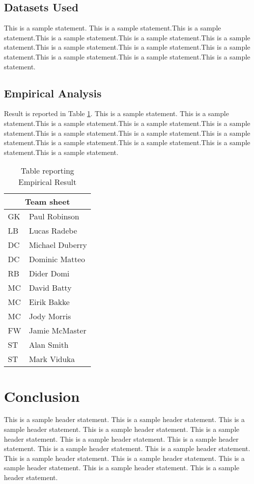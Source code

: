 \documentclass[12pt]{report}
\begin{document}
\section{Datasets Used}
This is a sample statement. This is a sample statement.This is a sample statement.This is a sample statement.This is a sample statement.This is a sample statement.This is a sample statement.This is a sample statement.This is a sample statement.This is a sample statement.This is a sample statement.This is a sample statement.

\section{Empirical Analysis}
Result is reported in Table \ref{sampletable}. This is a sample statement. This is a sample statement.This is a sample statement.This is a sample statement.This is a sample statement.This is a sample statement.This is a sample statement.This is a sample statement.This is a sample statement.This is a sample statement.This is a sample statement.This is a sample statement.

\begin{table}
\label{sampletable}
\caption{Table reporting Empirical Result}
\centering
\begin{tabular}{ |l|l| }
  \hline
  \multicolumn{2}{|c|}{Team sheet} \\
  \hline
  GK & Paul Robinson \\
  LB & Lucas Radebe \\
  DC & Michael Duberry \\
  DC & Dominic Matteo \\
  RB & Dider Domi \\
  MC & David Batty \\
  MC & Eirik Bakke \\
  MC & Jody Morris \\
  FW & Jamie McMaster \\
  ST & Alan Smith \\
  ST & Mark Viduka \\
  \hline
\end{tabular}
\end{table}

\chapter{Conclusion}
This is a sample header statement. This is a sample header statement. This is a sample header statement. This is a sample header statement. This is a sample header statement. This is a sample header statement. This is a sample header statement. This is a sample header statement. This is a sample header statement. This is a sample header statement. This is a sample header statement. This is a sample header statement. This is a sample header statement. This is a sample header statement. 
\end{document}
